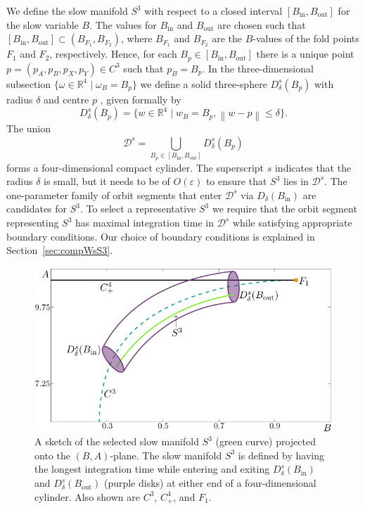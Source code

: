 \documentclass{ws-ijbc}
\begin{document}
We define the slow manifold $S^3$ with respect to a closed interval $[B_{\mathrm{in}},B_{\mathrm{out}}]$ for the slow variable $B$.  The values for $B_{\mathrm{in}}$ and $B_{\mathrm{out}}$ are chosen such that $[B_{\mathrm{in}},B_{\mathrm{out}}] \subset (B_{F_1}, B_{F_2})$, where $B_{F_1}$ and $B_{F_2}$ are the $B$-values of the fold points $F_1$ and $F_2$, respectively.  Hence, for each $B_p \in [B_{\mathrm{in}},B_{\mathrm{out}}]$ there is a unique point $p=(p_A,p_B,p_X,p_Y) \in C^3$ such that $p_B = B_p$.  In the three-dimensional subsection $\{ \omega \in \mathbb{R}^4 \; | \; \omega_B=B_p\}$ we define a solid three-sphere $D^s_\delta(B_p)$ with radius $\delta$ and centre $p$ , given formally by
%
\begin{equation*}
D^s_\delta(B_p)=\{w \in \mathbb{R}^4 \; | \; w_B = B_p, \left\lVert w-p \right\rVert \leq \delta\}.
\end{equation*}    
\noindent
The union 
\begin{equation*}
\mathscr{D}^s = \bigcup\limits_{B_p \in [B_{\mathrm{in}}, B_{\mathrm{out}}]}^{} D^s_\delta(B_p)
\end{equation*}
%
forms a four-dimensional compact cylinder.  The superscript $s$ indicates that the radius $\delta$ is small, but it needs to be of $O(\varepsilon)$ to ensure that $S^3$ lies in $\mathscr{D}^s$.  The one-parameter family of orbit segments that enter $\mathscr{D}^s$ via $D_\delta(B_{\mathrm{in}})$ are candidates for $S^3$.   To select a representative $S^3$ we require that the orbit segment representing $S^3$ has maximal integration time in $\mathscr{D}^s$ while satisfying appropriate boundary conditions.  Our choice of boundary conditions is explained in Section~\ref{sec:compWsS3}.

\begin{figure}[!t]
\begin{center}
\includegraphics{./figures/MKMO_2.pdf}
\end{center}
\caption{A sketch of the selected slow manifold $S^3$ (green curve) projected onto the $(B,A)$-plane.  The slow manifold $S^3$ is defined by having the longest integration time while entering and exiting  $D^s_\delta(B_{\mathrm{in}})$ and $D^s_\delta(B_{\mathrm{out}})$ (purple disks) at either end of a four-dimensional cylinder.  Also shown are $C^3$, $C^4_+$, and $F_1$.}
\label{figure_2}
\end{figure}
\end{document}
